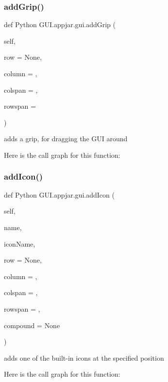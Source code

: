 \subsubsection{\texorpdfstring{add\+Grip()}{addGrip()}}
{\footnotesize\ttfamily def Python G\+U\+I.\+appjar.\+gui.\+add\+Grip (\begin{DoxyParamCaption}\item[{}]{self,  }\item[{}]{row = {\ttfamily None},  }\item[{}]{column = {},  }\item[{}]{colspan = {},  }\item[{}]{rowspan = {} }\end{DoxyParamCaption})}

\begin{DoxyVerb}adds a grip, for dragging the GUI around \end{DoxyVerb}
 Here is the call graph for this function\+:
\mbox{\label{class_python_01_g_u_i_1_1appjar_1_1gui_ae0d9a9f5abff94aa63f3df36f37f193e}} 
\subsubsection{\texorpdfstring{add\+Icon()}{addIcon()}}
{\footnotesize\ttfamily def Python G\+U\+I.\+appjar.\+gui.\+add\+Icon (\begin{DoxyParamCaption}\item[{}]{self,  }\item[{}]{name,  }\item[{}]{icon\+Name,  }\item[{}]{row = {\ttfamily None},  }\item[{}]{column = {},  }\item[{}]{colspan = {},  }\item[{}]{rowspan = {},  }\item[{}]{compound = {\ttfamily None} }\end{DoxyParamCaption})}

\begin{DoxyVerb}adds one of the built-in  icons at the specified position \end{DoxyVerb}
 Here is the call graph for this function\+:
\mbox{\label{class_python_01_g_u_i_1_1appjar_1_1gui_a3a892e703a45ff97b22dbc7040dfb21e}} 
